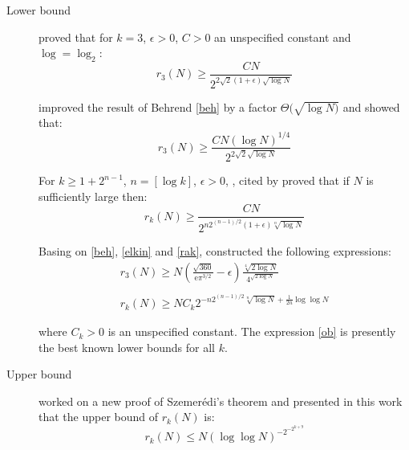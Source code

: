\begin{description}
\item[Lower bound]
\cite{behrend1946sets} proved that for $k=3$, $\epsilon >0$, $C>0$ an unspecified constant and $\log =\log_2 $:
\begin{equation}
r_3(N) \geq \frac{CN}{2^{2\sqrt{2}(1+\epsilon) \sqrt{\log N}}} \label{beh}
\end{equation}

\cite{elkin2010improved} improved the result of Behrend \eqref{beh} by a factor $\Theta (\sqrt{\log N)}$ and showed that:
\begin{equation}
r_3(N) \geq \frac{CN (\log N)^{1/4}}{2^{2\sqrt{2} \sqrt{\log N}}} \label{elkin}
\end{equation}

For $k \geq 1+2^{n-1}$,  $n=[\log k]$, $\epsilon >0$, \cite{rankin1961xxiv}, cited by \cite{o2011sets} proved that if $N$ is sufficiently large then:
\begin{equation}
r_k(N) \geq \frac{CN}{2^{n2^{(n-1)/2}(1+\epsilon) \sqrt[n]{\log N}}} \label{rak}
\end{equation}


Basing on \eqref{beh}, \eqref{elkin} and \eqref{rak}, \cite{o2011sets} constructed  the following expressions:
\begin{align}
r_3(N) \geq N \left( \frac{\sqrt{360}}{\mathrm{e}\pi^{3/2}}-\epsilon \right) \frac{\sqrt[4]{2\log N}}{4^{\sqrt{2\log N}}} \label{r31}\\ 
 \nonumber \\
r_k(N) \geq NC_k 2^{-n2^{(n-1)/2} \sqrt[n]{\log N} +\frac{1}{2n} \log \log N } \label{ob}
\end{align}

where $C_k >0$ is an unspecified constant. The expression \eqref{ob} is presently the best known  lower bounds for all $k.$

\item[Upper bound]
\cite{gowers2001new} worked on a new proof of Szemerédi's theorem and presented in this work that the upper bound of $r_k(N)$ is:
\begin{equation}
r_k(N) \leq N \left(\log \log N\right)^{-2^{-2^{k+9}}} \label{gow}
\end{equation}


\end{description}
